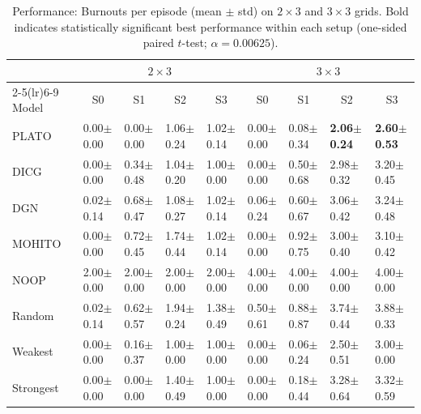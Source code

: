 \begin{table}[!t]
\centering
\small
\setlength{\tabcolsep}{1.4pt}
\renewcommand{\arraystretch}{1.02}
\begin{tabular}{@{\hspace{2pt}}l|l|l|l|l||l|l|l|l@{\hspace{2pt}}}
\toprule
& \multicolumn{4}{c||}{$2\times 3$} & \multicolumn{4}{c}{$3\times 3$} \\
\cmidrule(lr){2-5}\cmidrule(lr){6-9}
Model & \multicolumn{1}{c|}{S0} & \multicolumn{1}{c|}{S1} & \multicolumn{1}{c|}{S2} & \multicolumn{1}{c||}{S3}
      & \multicolumn{1}{c|}{S0} & \multicolumn{1}{c|}{S1} & \multicolumn{1}{c|}{S2} & \multicolumn{1}{c}{S3} \\
\midrule
PLATO & 0.00$\pm$0.00 & 0.00$\pm$0.00 & 1.06$\pm$0.24 & 1.02$\pm$0.14
& 0.00$\pm$0.00 & 0.08$\pm$0.34 & \textbf{2.06$\pm$0.24} & \textbf{2.60$\pm$0.53}\\
DICG & 0.00$\pm$0.00 & 0.34$\pm$0.48 & 1.04$\pm$0.20 & 1.00$\pm$0.00
& 0.00$\pm$0.00 & 0.50$\pm$0.68 & 2.98$\pm$0.32 & 3.20$\pm$0.45\\
DGN & 0.02$\pm$0.14 & 0.68$\pm$0.47 & 1.08$\pm$0.27 & 1.02$\pm$0.14
& 0.06$\pm$0.24 & 0.60$\pm$0.67 & 3.06$\pm$0.42 & 3.24$\pm$0.48\\
MOHITO  & 0.00$\pm$0.00 & 0.72$\pm$0.45 & 1.74$\pm$0.44 & 1.02$\pm$0.14
& 0.00$\pm$0.00 & 0.92$\pm$0.75 & 3.00$\pm$0.40 & 3.10$\pm$0.42 \\
NOOP & 2.00$\pm$0.00 & 2.00$\pm$0.00 & 2.00$\pm$0.00 & 2.00$\pm$0.00
& 4.00$\pm$0.00 & 4.00$\pm$0.00 & 4.00$\pm$0.00 & 4.00$\pm$0.00 \\
Random & 0.02$\pm$0.14 & 0.62$\pm$0.57 & 1.94$\pm$0.24 & 1.38$\pm$0.49
& 0.50$\pm$0.61 & 0.88$\pm$0.87 & 3.74$\pm$0.44 & 3.88$\pm$0.33\\
Weakest & 0.00$\pm$0.00 & 0.16$\pm$0.37 & 1.00$\pm$0.00 & 1.00$\pm$0.00
& 0.00$\pm$0.00 & 0.06$\pm$0.24 & 2.50$\pm$0.51 & 3.00$\pm$0.00 \\
Strongest & 0.00$\pm$0.00 & 0.00$\pm$0.00 & 1.40$\pm$0.49 & 1.00$\pm$0.00
& 0.00$\pm$0.00 & 0.18$\pm$0.44 & 3.28$\pm$0.64 & 3.32$\pm$0.59 \\


\bottomrule
\end{tabular}
\caption{Performance: Burnouts per episode (mean $\pm$ std) on $2\times 3$ and $3\times 3$ grids. Bold indicates statistically significant best performance within each setup (one-sided paired $t$-test; $\alpha=0.00625$).}
\label{tab:burnout_2x3_3x3}
\end{table}


